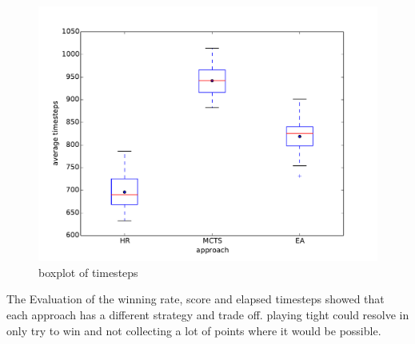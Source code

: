 \begin{figure}[H]
\centering
\includegraphics[scale=0.45]{images/eval_all_timesteps.pdf}
\caption{boxplot of timesteps}
\label{fig:eval_all_timesteps}
\end{figure}


The Evaluation of the winning rate, score and elapsed timesteps showed that each approach has a different strategy and trade off.
playing tight could resolve in only try to win and not collecting a lot of points where it would be possible.


